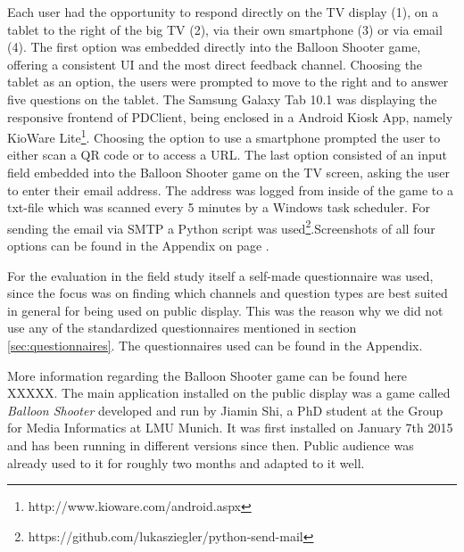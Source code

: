 		Each user had the opportunity to respond directly on the TV display (1), on a tablet to the right of the big TV (2), via their own smartphone (3) or via email (4). The first option was embedded directly into the Balloon Shooter game, offering a consistent UI and the most direct feedback channel. Choosing the tablet as an option, the users were prompted to move to the right and to answer five questions on the tablet. The Samsung Galaxy Tab 10.1 was displaying the responsive frontend of PDClient, being enclosed in a Android Kiosk App, namely KioWare Lite\footnote{http://www.kioware.com/android.aspx}. Choosing the option to use a smartphone prompted the user to either scan a QR code or to access a URL. The last option consisted of an input field embedded into the Balloon Shooter game on the TV screen, asking the user to enter their email address. The address was logged from inside of the game to a txt-file which was scanned every 5 minutes by a Windows task scheduler. For sending the email via SMTP a Python script was used\footnote{https://github.com/lukasziegler/python-send-mail}.Screenshots of all four options can be found in the Appendix on page \pageref{appendix:screenshots-balloon-shooter}.



		For the evaluation in the field study itself a self-made questionnaire was used, since the focus was on finding which channels and question types are best suited in general for being used on public display. This was the reason why we did not use any of the standardized questionnaires mentioned in section \ref{sec:questionnaires}. The questionnaires used can be found in the Appendix.



		More information regarding the Balloon Shooter game can be found here XXXXX. 
		The main application installed on the public display was a game called \textit{Balloon Shooter} developed and run by Jiamin Shi, a PhD student at the Group for Media Informatics at LMU Munich. It was first installed on January 7th 2015 and has been running in different versions since then. Public audience was already used to it for roughly two months and adapted to it well.





